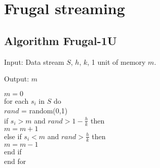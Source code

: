 \chapter{\label{frugal-alg}Frugal streaming}


\section*{Algorithm Frugal-1U}

Input: Data stream $S$, $h$, $k$, 1 unit of memory $m$.

Output: $m$

$m = 0$\\
for each $s_i$ in $S$ do \\
\hspace*{5mm}$rand$ = random(0,1) \\
\hspace*{5mm}if $s_{i} > m$ and $rand > 1 - \frac{h}{k}$ then\\
 \hspace*{10mm}    $m = m + 1$ \\
\hspace*{5mm}  else if $s_{i} < m$ and $rand > \frac{h}{k}$ then\\
\hspace*{10mm}     $m = m - 1$ \\
\hspace*{5mm}end if\\
end for\\


 
